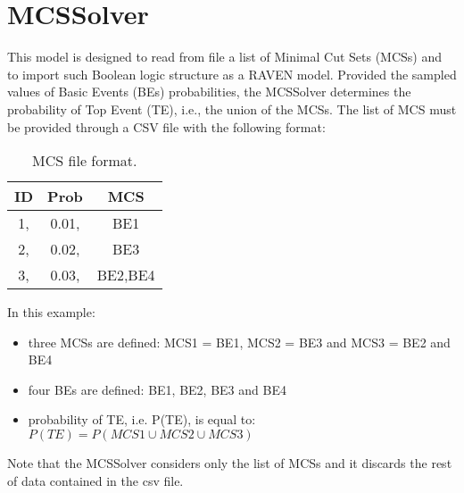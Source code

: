 \section{MCSSolver}
\label{sec:MCSSolver}

This model is designed to read from file a list of Minimal Cut Sets (MCSs) and to import such Boolean logic structure as a RAVEN model.
Provided the sampled values of Basic Events (BEs) probabilities, the MCSSolver determines the probability of Top Event (TE), i.e., the union of the MCSs.
The list of MCS must be provided through a CSV file with the following format:

\begin{table}
  \begin{center}
    \caption{MCS file format.}
    \label{tab:table1}
    \begin{tabular}{c|c|c} 
      \textbf{ID} & \textbf{Prob} & \textbf{MCS}\\
      \hline
      1, & 0.01, & BE1\\
      2, & 0.02, & BE3\\
      3, & 0.03, & BE2,BE4\\
    \end{tabular}
  \end{center}
\end{table}

In this example:
\begin{itemize}
  \item three MCSs are defined: MCS1 = BE1, MCS2 = BE3 and MCS3 = BE2 and BE4 
  \item four BEs are defined: BE1, BE2, BE3 and BE4
  \item probability of TE, i.e. P(TE), is equal to: $P(TE) = P(MCS1 \cup MCS2 \cup MCS3)$
\end{itemize}

Note that the MCSSolver considers only the list of MCSs and it discards the rest of data contained in the csv file.


